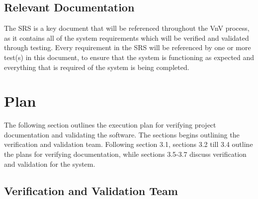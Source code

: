 \documentclass[12pt, titlepage]{article}
\begin{document}
\subsection{Relevant Documentation}


\cite{SRS}


The SRS is a key document that will be referenced throughout the VnV process, as it contains all of the system requirements which will be verified and validated through testing. Every requirement in the SRS will be referenced by one or more test(s) in this document, to ensure that the system is functioning as expected and everything that is required of the system is being completed.

\section{Plan}
\label{section:JustPlan}

The following section outlines the execution plan for verifying project documentation and validating the software. The sections begins outlining the verification and validation team. Following section 3.1, sections 3.2 till 3.4 outline the plans for verifying documentation, while sections 3.5-3.7 discuss verification and validation for the system.

\subsection{Verification and Validation Team}
\end{document}
